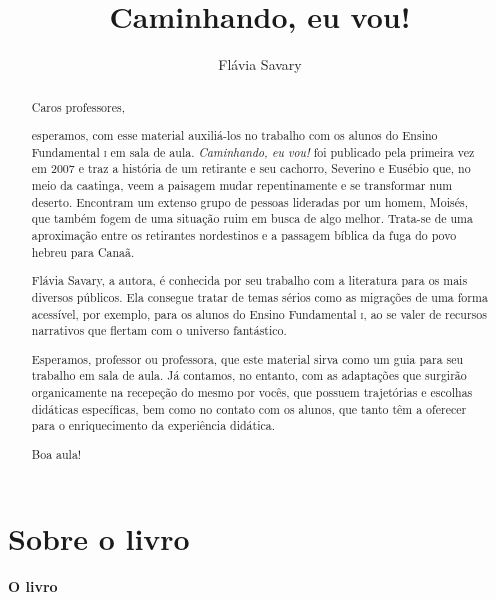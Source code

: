\documentclass[11pt]{extarticle}
\newcommand{\AutorLivro}{Flávia Savary}
\newcommand{\TituloLivro}{Caminhando, eu vou!}
\newcommand{\colaborador}{Renier Silva}
\begin{document}
\title{\TituloLivro}
\author{\AutorLivro}
\def\authornotes{\colaborador}

\date{}
\maketitle


\tableofcontents


\begin{abstract}

Caros professores, 

esperamos, com esse material auxiliá-los no trabalho com os alunos 
do Ensino Fundamental \textsc{i} em sala de aula. \textit{Caminhando, eu vou!} foi publicado
pela primeira vez em 2007 e traz a história de um retirante e seu cachorro, Severino e Eusébio que,
no meio da caatinga, veem a paisagem mudar repentinamente e se transformar num deserto.
Encontram um extenso grupo de pessoas lideradas por um homem, Moisés, que também fogem de uma situação 
ruim em busca de algo melhor. Trata-se de uma aproximação entre os retirantes nordestinos
e a passagem bíblica da fuga do povo hebreu para Canaã. 

Flávia Savary, a autora, é conhecida por seu trabalho com a literatura para
os mais diversos públicos. Ela consegue tratar de temas sérios como as migrações
de uma forma acessível, por exemplo, para os alunos do Ensino Fundamental \textsc{i},
ao se valer de recursos narrativos que flertam com o universo fantástico. 

Esperamos, professor ou professora, que este material sirva como um guia 
para seu trabalho em sala de aula. Já contamos, no entanto, com as adaptações
que surgirão organicamente na recepeção do mesmo por vocês, que possuem 
trajetórias e escolhas didáticas específicas, bem como no contato com os 
alunos, que tanto têm a oferecer para o enriquecimento da experiência didática.

Boa aula!

\end{abstract}

\section{Sobre o livro}

\paragraph{O livro} 
\end{document}
